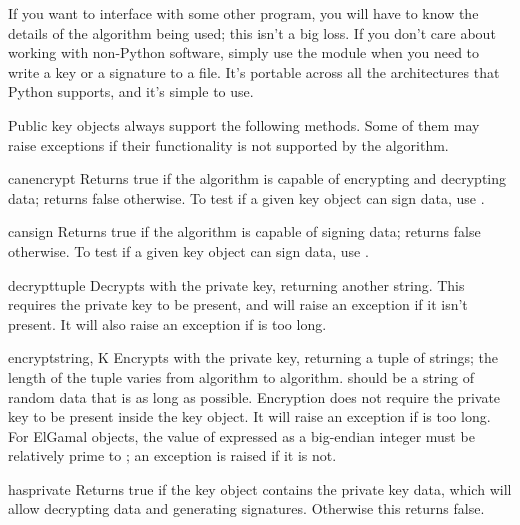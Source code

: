 \documentclass{howto}
\begin{document}
If you want to interface with some other program, you will have to know
the details of the algorithm being used; this isn't a big loss.  If you
don't care about working with non-Python software, simply use the
 module when you need to write a key or a signature to a
file.  It's portable across all the architectures that Python supports,
and it's simple to use.

Public key objects always support the following methods.  Some of them
may raise exceptions if their functionality is not supported by the
algorithm.

\begin{funcdesc}{canencrypt}{}
Returns true if the algorithm is capable of encrypting and decrypting
data; returns false otherwise.  To test if a given key object can sign
data, use .
\end{funcdesc}

\begin{funcdesc}{cansign}{}
Returns true if the algorithm is capable of signing data; returns false
otherwise.  To test if a given key object can sign data, use
.
\end{funcdesc}

\begin{funcdesc}{decrypt}{tuple}
Decrypts  with the private key, returning another string.
This requires the private key to be present, and will raise an exception
if it isn't present.  It will also raise an exception if  is
too long.
\end{funcdesc}

\begin{funcdesc}{encrypt}{string, K}
Encrypts  with the private key, returning a tuple of
strings; the length of the tuple varies from algorithm to algorithm.  
 should be a string of random data that is as long as
possible.  Encryption does not require the private key to be present
inside the key object.  It will raise an exception if  is
too long.  For ElGamal objects, the value of  expressed as a
big-endian integer must be relatively prime to ; an
exception is raised if it is not.
\end{funcdesc}

\begin{funcdesc}{hasprivate}{}
Returns true if the key object contains the private key data, which
will allow decrypting data and generating signatures.
Otherwise this returns false.
\end{funcdesc}
\end{document}
